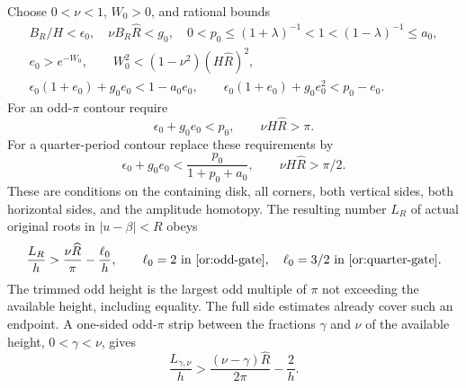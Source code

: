 Choose $0<\nu<1$, $W_0>0$, and rational bounds
\begin{equation}\label{or:contour-gates}
 \begin{gathered}
 B_R/H<\epsilon_0,\quad \nu B_R\widehat R<g_0,\quad
 0<p_0\le(1+\lambda)^{-1}<1<(1-\lambda)^{-1}\le a_0,\\
 e_0>e^{-W_0},\qquad
 W_0^2<(1-\nu^2)(H\widehat R)^2,\\
 \epsilon_0(1+e_0)+g_0e_0<1-a_0e_0,\qquad
 \epsilon_0(1+e_0)+g_0e_0^2<p_0-e_0.
 \end{gathered}
\end{equation}
For an odd-$\pi$ contour require
\begin{equation}\label{or:odd-gate}
      \epsilon_0+g_0e_0<p_0,\qquad \nu H\widehat R>\pi.
\end{equation}
For a quarter-period contour replace these requirements by
\begin{equation}\label{or:quarter-gate}
 \epsilon_0+g_0e_0<\frac{p_0}{1+p_0+a_0},\qquad
                        \nu H\widehat R>\pi/2.
\end{equation}
These are conditions on the containing disk, all corners, both vertical
sides, both horizontal sides, and the amplitude homotopy.  The resulting
number $L_R$ of actual original roots in $|u-\beta|<R$ obeys
\begin{equation}\label{or:counts}
 \frac{L_R}{h}>\frac{\nu\widehat R}{\pi}-\frac{\ell_0}{h},
 \qquad
 \ell_0=2\ \hbox{in \eqref{or:odd-gate}},\quad
 \ell_0=3/2\ \hbox{in \eqref{or:quarter-gate}}.
\end{equation}
The trimmed odd height is the largest odd multiple of $\pi$ not
exceeding the available height, including equality.  The full side
estimates already cover such an endpoint.  A one-sided odd-$\pi$ strip
between the fractions $\gamma$ and $\nu$ of the available height,
$0<\gamma<\nu$, gives
\begin{equation}\label{or:one-sided-count}
                    \frac{L_{\gamma,\nu}}h>
           \frac{(\nu-\gamma)\widehat R}{2\pi}-\frac2h.
\end{equation}

